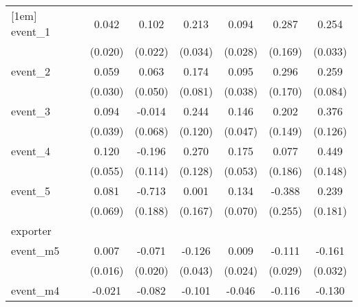 {\begin{tabular}{l*{6}{c}}
[1em]
event\_1     &       0.042\sym{*}  &       0.102\sym{***}&       0.213\sym{***}&       0.094\sym{***}&       0.287         &       0.254\sym{***}\\
            &     (0.020)         &     (0.022)         &     (0.034)         &     (0.028)         &     (0.169)         &     (0.033)         \\
[1em]
event\_2     &       0.059         &       0.063         &       0.174\sym{*}  &       0.095\sym{*}  &       0.296         &       0.259\sym{**} \\
            &     (0.030)         &     (0.050)         &     (0.081)         &     (0.038)         &     (0.170)         &     (0.084)         \\
[1em]
event\_3     &       0.094\sym{*}  &      -0.014         &       0.244\sym{*}  &       0.146\sym{**} &       0.202         &       0.376\sym{**} \\
            &     (0.039)         &     (0.068)         &     (0.120)         &     (0.047)         &     (0.149)         &     (0.126)         \\
[1em]
event\_4     &       0.120\sym{*}  &      -0.196         &       0.270\sym{*}  &       0.175\sym{***}&       0.077         &       0.449\sym{**} \\
            &     (0.055)         &     (0.114)         &     (0.128)         &     (0.053)         &     (0.186)         &     (0.148)         \\
[1em]
event\_5     &       0.081         &      -0.713\sym{***}&       0.001         &       0.134         &      -0.388         &       0.239         \\
            &     (0.069)         &     (0.188)         &     (0.167)         &     (0.070)         &     (0.255)         &     (0.181)         \\
\hline
exporter    &                     &                     &                     &                     &                     &                     \\
event\_m5    &       0.007         &      -0.071\sym{***}&      -0.126\sym{**} &       0.009         &      -0.111\sym{***}&      -0.161\sym{***}\\
            &     (0.016)         &     (0.020)         &     (0.043)         &     (0.024)         &     (0.029)         &     (0.032)         \\
[1em]
event\_m4    &      -0.021         &      -0.082\sym{***}&      -0.101\sym{**} &      -0.046         &      -0.116\sym{***}&      -0.130\sym{***}\\

\end{tabular}}
